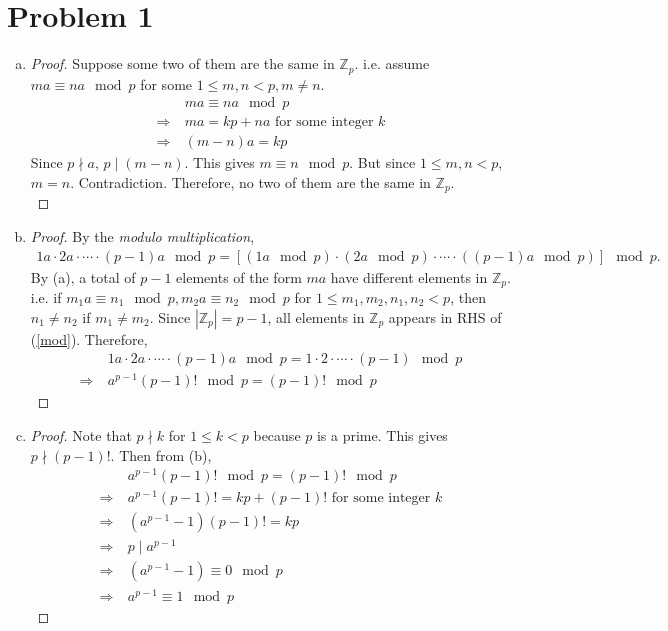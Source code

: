\section*{Problem 1}
	\begin{enumerate} [(a)]
		\item \begin{proof}
			Suppose some two of them are the same in $\mathbb{Z}_p$. i.e. assume $ma \equiv na \mod p$ for some $1 \leq m, n < p, m \neq n$.
			\begin{align*}
				&ma \equiv na \mod p\\
				\Rightarrow\ & ma = kp + na \mbox{ for some integer }k\\
				\Rightarrow\ & (m - n)a = kp
			\end{align*}
		Since $p \nmid a$, $p \mid (m - n)$. This gives $m \equiv n \mod p$. But since $1 \leq m, n < p$, $m = n$. Contradiction. Therefore, no two of them are the same in $\mathbb{Z}_p$.\\ 
		\end{proof}
		\item \begin{proof}
			By the \textit{modulo multiplication},\\
			\begin{align}
				1a \cdot 2a \cdot \cdots \cdot (p - 1)a \mod p = \left[(1a \mod p) \cdot (2a \mod p) \cdot \cdots \cdot ((p - 1)a \mod p)\right] \mod p. \label{mod}
			\end{align}
			By (a), a total of $p - 1$ elements of the form $ma$ have different elements in $\mathbb{Z}_p$. i.e. if $m_1a \equiv n_1 \mod p, m_2a \equiv n_2 \mod p$ for $1 \leq m_1, m_2, n_1, n_2 < p$, then $n_1 \neq n_2$ if $m_1 \neq m_2$. Since $\left|\mathbb{Z}_p\right| = p - 1$, all elements in $\mathbb{Z}_p$ appears in RHS of (\ref{mod}). Therefore,
			\begin{align*}
				&1a \cdot 2a \cdot \cdots \cdot (p - 1)a \mod p = 1\cdot2\cdot\cdots\cdot(p - 1) \mod p\\
				\Rightarrow\ & a^{p - 1}(p - 1)! \mod p = (p - 1)! \mod p
			\end{align*}
		\end{proof}
		\item \begin{proof}
			Note that $p \nmid k$ for $1 \leq k < p$ because $p$ is a prime. This gives $p \nmid (p - 1)!$. Then from (b),
			\begin{align*}
				&a^{p - 1}(p - 1)! \mod p = (p - 1)! \mod p\\
				\Rightarrow\ & a^{p - 1}(p - 1)!  = kp + (p - 1)! \mbox{ for some integer }k\\
				\Rightarrow\ & \left(a^{p - 1} - 1\right)(p - 1)! = kp\\
				\Rightarrow\ & p \mid a^{p - 1}\\
				\Rightarrow\ & \left(a^{p - 1} - 1\right) \equiv 0 \mod p\\
				\Rightarrow\ & a^{p - 1} \equiv 1 \mod p
			\end{align*}
		\end{proof}
	\end{enumerate}